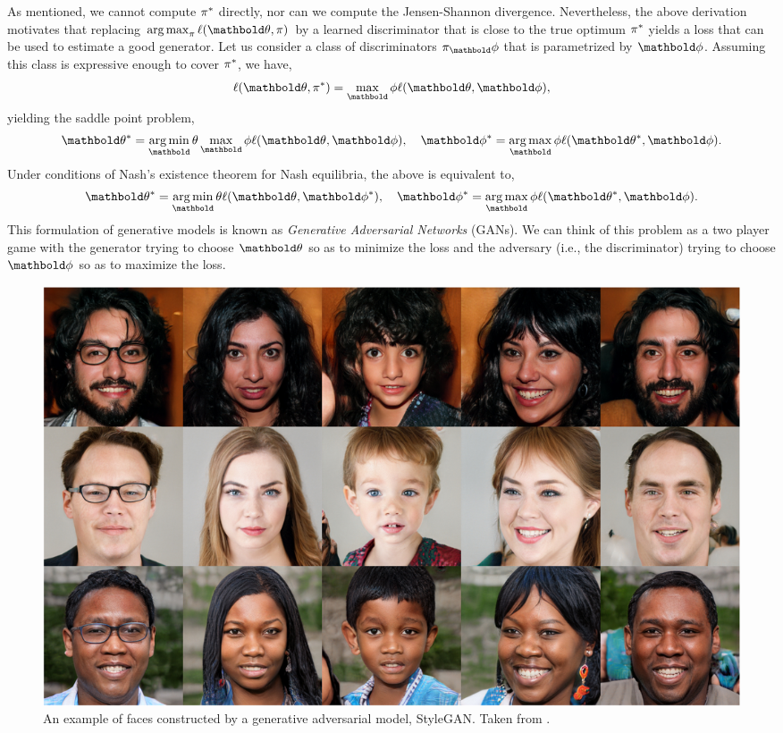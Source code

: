 \documentclass{tufte-handout}
\begin{document}
As mentioned, we cannot compute $\pi^*$ directly, nor can we compute the Jensen-Shannon divergence. Nevertheless, the above derivation motivates that replacing $\argmax_\pi \ell(\vtheta, \pi)$ by a learned discriminator that is close to the true optimum $\pi^*$ yields a loss that can be used to estimate a good generator. Let us consider a class of discriminators $\pi_\vphi$ that is parametrized by $\vphi$. Assuming this class is expressive enough to cover $\pi^*$, we have, \begin{align}
    \ell(\vtheta, \s{\pi}) = \max_\vphi \ell(\vtheta, \vphi),
\end{align} yielding the saddle point problem, \begin{align}
    \s{\vtheta} = \argmin_\vtheta \max_\vphi \ell(\vtheta, \vphi), \quad \s{\vphi} = \argmax_\vphi \ell(\s{\vtheta}, \vphi).
\end{align} Under conditions of Nash's existence theorem for Nash equilibria, the above is equivalent to, \begin{align}
    \s{\vtheta} = \argmin_\vtheta \ell(\vtheta, \s{\vphi}), \quad \s{\vphi} = \argmax_\vphi \ell(\s{\vtheta}, \vphi).
\end{align} This formulation of generative models is known as \emph{Generative Adversarial Networks} (GANs). We can think of this problem as a two player game with the generator trying to choose $\vtheta$ so as to minimize the loss and the adversary (i.e., the discriminator) trying to choose $\vphi$ so as to maximize the loss.



\begin{figure}
    \includegraphics[width=\textwidth]{figures/faces_gans.png}
    \caption{An example of faces constructed by a generative adversarial model, StyleGAN. Taken from \citep{karras2019style}.}
\end{figure}

\nocite{*}

\end{document}
